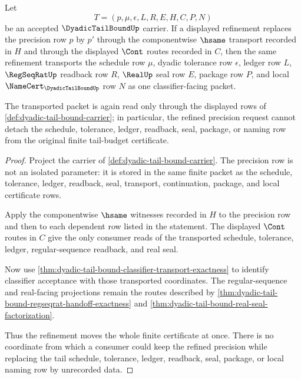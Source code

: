 \begin{theorem}
\label{thm:dyadic-tail-bound-precision-refinement-stability}
Let
$$
T=(p,\mu,\epsilon,L,R,E,H,C,P,N)
$$
be an accepted $\DyadicTailBoundUp$ carrier. If a displayed refinement replaces the precision row $p$ by $p'$ through the componentwise $\hsame$ transport recorded in $H$ and through the displayed $\Cont$ routes recorded in $C$, then the same refinement transports the schedule row $\mu$, dyadic tolerance row $\epsilon$, ledger row $L$, $\RegSeqRatUp$ readback row $R$, $\RealUp$ seal row $E$, package row $P$, and local $\NameCert_{\DyadicTailBoundUp}$ row $N$ as one classifier-facing packet.

The transported packet is again read only through the displayed rows of \autoref{def:dyadic-tail-bound-carrier}; in particular, the refined precision request cannot detach the schedule, tolerance, ledger, readback, seal, package, or naming row from the original finite tail-budget certificate.
\end{theorem}
\begin{proof}
Project the carrier of \autoref{def:dyadic-tail-bound-carrier}. The precision row is not an isolated parameter: it is stored in the same finite packet as the schedule, tolerance, ledger, readback, seal, transport, continuation, package, and local certificate rows.

Apply the componentwise $\hsame$ witnesses recorded in $H$ to the precision row and then to each dependent row listed in the statement. The displayed $\Cont$ routes in $C$ give the only consumer reads of the transported schedule, tolerance, ledger, regular-sequence readback, and real seal.

Now use \autoref{thm:dyadic-tail-bound-classifier-transport-exactness} to identify classifier acceptance with those transported coordinates. The regular-sequence and real-facing projections remain the routes described by \autoref{thm:dyadic-tail-bound-regseqrat-handoff-exactness} and \autoref{thm:dyadic-tail-bound-real-seal-factorization}.

Thus the refinement moves the whole finite certificate at once. There is no coordinate from which a consumer could keep the refined precision while replacing the tail schedule, tolerance, ledger, readback, seal, package, or local naming row by unrecorded data.
\end{proof}

